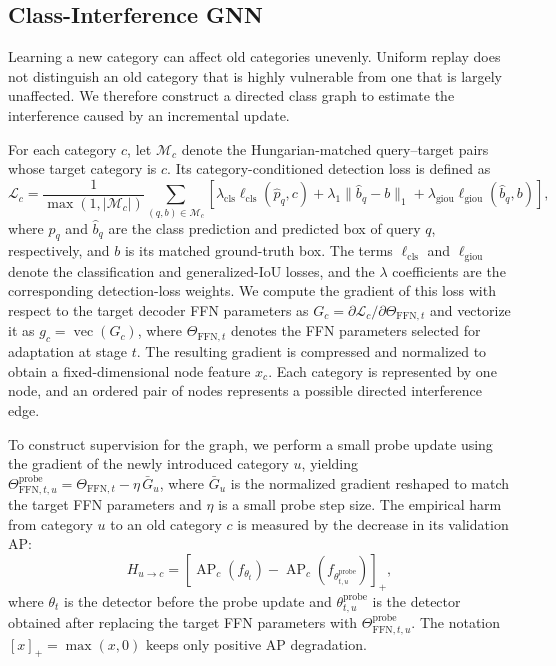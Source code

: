 \subsection{Class-Interference GNN}
\label{sec:class_interference_gnn}

Learning a new category can affect old categories unevenly.
Uniform replay does not distinguish an old category that is highly vulnerable
from one that is largely unaffected. We therefore construct a directed class
graph to estimate the interference caused by an incremental update.

For each category $c$, let $\mathcal{M}_c$ denote the Hungarian-matched
query--target pairs whose target category is $c$. Its category-conditioned
detection loss is defined as
\begin{equation}
\mathcal{L}_c
=\frac{1}{\max(1,|\mathcal{M}_c|)}
\sum_{(q,b)\in\mathcal{M}_c}
\left[
\lambda_{\mathrm{cls}}\ell_{\mathrm{cls}}(\hat{p}_q,c)
+\lambda_1\|\hat{b}_q-b\|_1
+\lambda_{\mathrm{giou}}\ell_{\mathrm{giou}}(\hat{b}_q,b)
\right],
\label{eq:category_detection_loss}
\end{equation}
where $\hat{p}_q$ and $\hat{b}_q$ are the class prediction and predicted box
of query $q$, respectively, and $b$ is its matched ground-truth box.
The terms $\ell_{\mathrm{cls}}$ and $\ell_{\mathrm{giou}}$ denote the
classification and generalized-IoU losses, and the $\lambda$ coefficients
are the corresponding detection-loss weights.
We compute the gradient of this loss with respect to the target decoder FFN
parameters as $G_c=\partial\mathcal{L}_c/\partial\Theta_{\mathrm{FFN},t}$
and vectorize it as $g_c=\operatorname{vec}(G_c)$, where
$\Theta_{\mathrm{FFN},t}$ denotes the FFN parameters selected for adaptation
at stage $t$. The resulting gradient is compressed and normalized to obtain a
fixed-dimensional node feature $x_c$. Each category is represented by one node,
and an ordered pair of nodes represents a possible directed interference edge.

To construct supervision for the graph, we perform a small probe update using
the gradient of the newly introduced category $u$, yielding
$\Theta_{\mathrm{FFN},t,u}^{\mathrm{probe}}
=\Theta_{\mathrm{FFN},t}-\eta\,\bar{G}_u$,
where $\bar{G}_u$ is the normalized gradient reshaped to match the target
FFN parameters and $\eta$ is a small probe step size. The empirical harm
from category $u$ to an old category $c$ is measured by the decrease in its
validation AP:
\begin{equation}
H_{u\rightarrow c}
=\left[\operatorname{AP}_{c}(f_{\theta_t})
-\operatorname{AP}_{c}(f_{\theta_{t,u}^{\mathrm{probe}}})\right]_{+},
\label{eq:empirical_harm}
\end{equation}
where $\theta_t$ is the detector before the probe update and
$\theta_{t,u}^{\mathrm{probe}}$ is the detector obtained after replacing the
target FFN parameters with $\Theta_{\mathrm{FFN},t,u}^{\mathrm{probe}}$.
The notation $[x]_{+}=\max(x,0)$ keeps only positive AP degradation.

